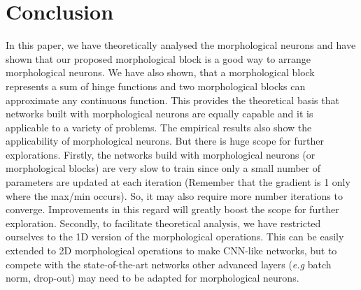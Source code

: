 \documentclass{bmvc2k}
\def\eg{\emph{e.g}\bmvaOneDot}
\begin{document}
\section{Conclusion}
\label{sec:conclustion}
In this paper, we have theoretically analysed the morphological neurons and have shown that our proposed morphological block is a good way to arrange morphological neurons. We have also shown, that a morphological block represents a sum of hinge functions and two morphological blocks can approximate any continuous function. This provides the theoretical basis that networks built with morphological neurons are equally capable and it is applicable to a variety of problems. The empirical results also show the applicability of morphological neurons. But there is huge scope for further explorations. Firstly, the networks build with morphological neurons (or morphological blocks) are very slow to train since only a small number of parameters are updated at each iteration (Remember that the gradient is 1 only where the max/min occurs). So, it may also require more number iterations to converge.
Improvements in this regard will greatly boost the scope for further exploration.
Secondly, to facilitate theoretical analysis, we have restricted ourselves to the 1D version of the morphological operations. This can be easily extended to 2D morphological operations to make CNN-like networks, but to compete with the state-of-the-art networks other advanced layers (\eg{} batch norm, drop-out) may need to be adapted for morphological neurons. 









\end{document}
